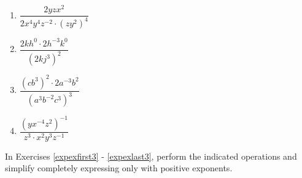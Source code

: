 \begin{multicols}{4}
\begin{enumerate}
\setcounter{enumi}{\value{HW}}

\item $\dfrac{2 y z x^2}{2 x^4 y^4 z^{- 2} \cdot (z y^2)^4}$
\item $\dfrac{2 k h^0 \cdot 2 h^{- 3} k^0}{(2 k j^3)^2}$
\item $\dfrac{(c b^3)^2 \cdot 2 a^{- 3} b^2}{(a^3 b^{- 2} c^3)^3}$
\item $\dfrac{(y x^{- 4} z^2)^{- 1}}{z^3 \cdot x^2 y^3 z^{- 1}}$ \label{expexlast2}

\setcounter{HW}{\value{enumi}}
\end{enumerate}
\end{multicols}

In Exercises \ref{expexfirst3} - \ref{expexlast3}, perform the indicated operations and simplify completely expressing only with positive exponents.


